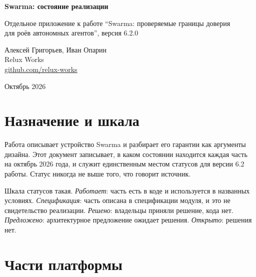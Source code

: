 \documentclass[10pt,a4paper]{article}
\begin{document}
\begin{center}
{\fontsize{15}{18.5}\selectfont\bfseries Swarma: состояние реализации\par}
\vspace{4pt}
{\normalsize Отдельное приложение к работе ``Swarma: проверяемые границы доверия\\ для роёв автономных агентов'', версия 6.2.0\par}
\vspace{6pt}
{\normalsize Алексей Григорьев, Иван Опарин\\
Relux Works\\
\href{https://github.com/relux-works}{github.com/relux-works}\par}
\vspace{3pt}
{\normalsize Октябрь 2026\par}
\end{center}

\section{Назначение и шкала}

Работа описывает устройство Swarma и разбирает его гарантии как аргументы дизайна. Этот документ записывает, в каком состоянии находится каждая часть на октябрь 2026 года, и служит единственным местом статусов для версии 6.2 работы. Статус никогда не выше того, что говорит источник.

Шкала статусов такая. \emph{Работает}: часть есть в коде и используется в названных условиях. \emph{Спецификация}: часть описана в спецификации модуля, и это не свидетельство реализации. \emph{Решено}: владельцы приняли решение, кода нет. \emph{Предложено}: архитектурное предложение ожидает решения. \emph{Открыто}: решения нет.

\section{Части платформы}
\end{document}
